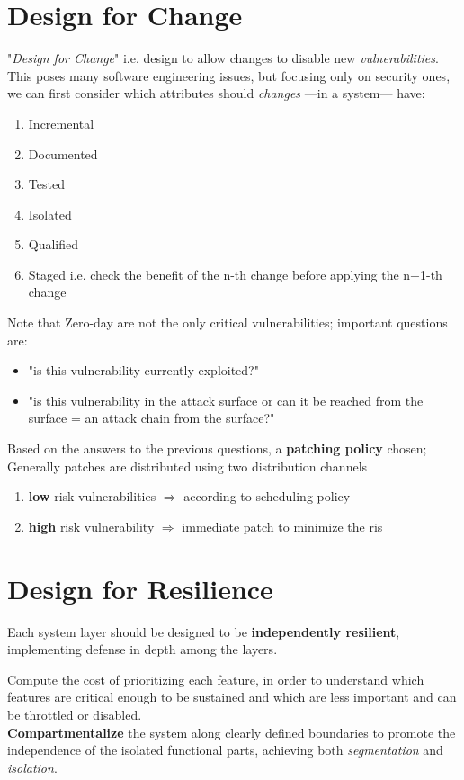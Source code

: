 \section{Design for Change}

"\textit{Design for Change}" i.e. design to allow changes to disable new \textit{vulnerabilities}.
This poses many software engineering issues, but focusing only on security ones,
we can first consider which attributes should \textit{changes} {---}in a system{---} have:
\begin{enumerate}
   \item Incremental
   \item Documented
   \item Tested
   \item Isolated
   \item Qualified
   \item Staged i.e. check the benefit of the n-th change before applying the
   n+1-th change
\end{enumerate}

Note that Zero-day are not the only critical vulnerabilities;
important questions are:
\begin{itemize}
   \item "is this vulnerability currently exploited?"
   \item "is this vulnerability in the attack surface or can it be reached from the surface = an attack chain from the surface?"
\end{itemize}
Based on the answers to the previous questions, a \textbf{patching policy} chosen;
Generally patches are distributed using two distribution channels
\begin{enumerate}
   \item \textbf{low} risk vulnerabilities $\Rightarrow$ according to scheduling policy
   \item \textbf{high} risk vulnerability $\Rightarrow$ immediate patch to minimize the ris
\end{enumerate}

\section{Design for Resilience}

Each system layer should be designed to be \textbf{independently resilient}, implementing defense in depth among the
layers.

Compute the cost of prioritizing each feature, in order to understand which features are critical
enough to be sustained and which are less important and can be throttled or disabled.\\
\textbf{Compartmentalize} the system along clearly defined boundaries to promote the
independence of the isolated functional parts, achieving both \textit{segmentation} and \textit{isolation}.

